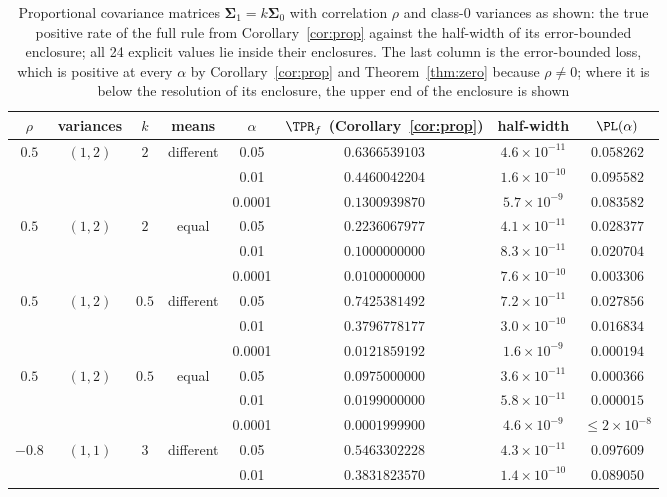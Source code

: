\begin{table}[t]
\caption{Proportional covariance matrices $\bm\Sigma_1=k\bm\Sigma_0$ with correlation $\rho$ and class-0 variances as shown: the true positive rate of the full rule from Corollary~\ref{cor:prop} against the half-width of its error-bounded enclosure; all 24 explicit values lie inside their enclosures. The last column is the error-bounded loss, which is positive at every $\alpha$ by Corollary~\ref{cor:prop} and Theorem~\ref{thm:zero} because $\rho\ne0$; where it is below the resolution of its enclosure, the upper end of the enclosure is shown}\label{tab:proportional}
\footnotesize\setlength{\tabcolsep}{3pt}
\begin{tabular*}{\textwidth}{@{\extracolsep\fill}cccccccc@{}}
\toprule
$\rho$ & variances & $k$ & means & $\alpha$ & $\TPR_f$ (Corollary~\ref{cor:prop}) & half-width & $\PL(\alpha)$\\
\midrule
$0.5$ & $(1,2)$ & $2$ & different & 0.05 & $0.6366539103$ & $4.6\times10^{-11}$ & $0.058262$\\
 & & & & 0.01 & $0.4460042204$ & $1.6\times10^{-10}$ & $0.095582$\\
 & & & & 0.0001 & $0.1300939870$ & $5.7\times10^{-9}$ & $0.083582$\\
$0.5$ & $(1,2)$ & $2$ & equal & 0.05 & $0.2236067977$ & $4.1\times10^{-11}$ & $0.028377$\\
 & & & & 0.01 & $0.1000000000$ & $8.3\times10^{-11}$ & $0.020704$\\
 & & & & 0.0001 & $0.0100000000$ & $7.6\times10^{-10}$ & $0.003306$\\
$0.5$ & $(1,2)$ & $0.5$ & different & 0.05 & $0.7425381492$ & $7.2\times10^{-11}$ & $0.027856$\\
 & & & & 0.01 & $0.3796778177$ & $3.0\times10^{-10}$ & $0.016834$\\
 & & & & 0.0001 & $0.0121859192$ & $1.6\times10^{-9}$ & $0.000194$\\
$0.5$ & $(1,2)$ & $0.5$ & equal & 0.05 & $0.0975000000$ & $3.6\times10^{-11}$ & $0.000366$\\
 & & & & 0.01 & $0.0199000000$ & $5.8\times10^{-11}$ & $0.000015$\\
 & & & & 0.0001 & $0.0001999900$ & $4.6\times10^{-9}$ & $\le2\times10^{-8}$\\
$-0.8$ & $(1,1)$ & $3$ & different & 0.05 & $0.5463302228$ & $4.3\times10^{-11}$ & $0.097609$\\
 & & & & 0.01 & $0.3831823570$ & $1.4\times10^{-10}$ & $0.089050$\\

\end{tabular*}
\end{table}
